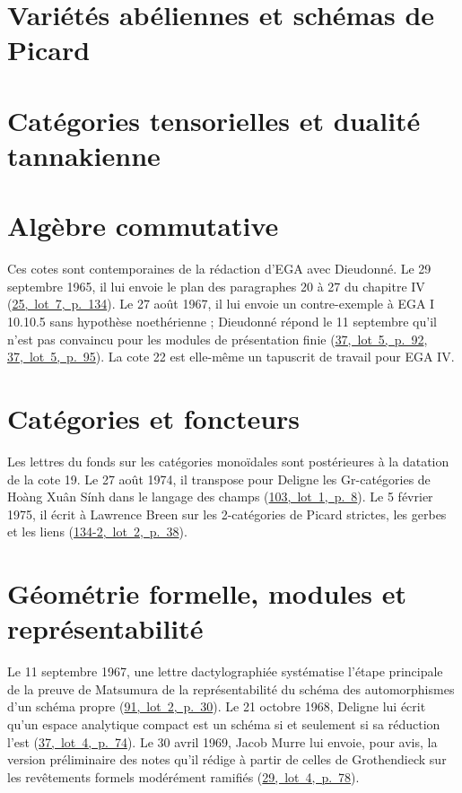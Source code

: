 \documentclass[11pt]{article}
\newcommand{\lot}[3]{\mbox{\href{https://grothendieck.commutator.io/\##1/#2/p#3}{#1, lot #2, p.~#3}}}
\newcommand{\lettres}[1]{{\small #1\par}\medskip}
\theoremstyle{plain}
\theoremstyle{definition}
\theoremstyle{plain}
\theoremstyle{definition}
\theoremstyle{remark}
\renewcommand{\_}{\bkunderscore\allowbreak}
\begin{document}
\part{Variétés abéliennes et schémas de Picard}







\part{Catégories tensorielles et dualité tannakienne}



\part{Algèbre commutative}
\lettres{Ces cotes sont contemporaines de la rédaction d'EGA avec Dieudonné. Le 29 septembre 1965, il lui envoie le plan des paragraphes 20 à 27 du chapitre IV (\lot{25}{7}{134}). Le 27 août 1967, il lui envoie un contre-exemple à EGA I 10.10.5 sans hypothèse noethérienne ; Dieudonné répond le 11 septembre qu'il n'est pas convaincu pour les modules de présentation finie (\lot{37}{5}{92}, \lot{37}{5}{95}). La cote 22 est elle-même un tapuscrit de travail pour EGA IV.}





\part{Catégories et foncteurs}
\lettres{Les lettres du fonds sur les catégories monoïdales sont postérieures à la datation de la cote 19. Le 27 août 1974, il transpose pour Deligne les Gr-catégories de Hoàng Xuân Sính dans le langage des champs (\lot{103}{1}{8}). Le 5 février 1975, il écrit à Lawrence Breen sur les 2-catégories de Picard strictes, les gerbes et les liens (\lot{134-2}{2}{38}).}





\part{Géométrie formelle, modules et représentabilité}
\lettres{Le 11 septembre 1967, une lettre dactylographiée systématise l'étape principale de la preuve de Matsumura de la représentabilité du schéma des automorphismes d'un schéma propre (\lot{91}{2}{30}). Le 21 octobre 1968, Deligne lui écrit qu'un espace analytique compact est un schéma si et seulement si sa réduction l'est (\lot{37}{4}{74}). Le 30 avril 1969, Jacob Murre lui envoie, pour avis, la version préliminaire des notes qu'il rédige à partir de celles de Grothendieck sur les revêtements formels modérément ramifiés (\lot{29}{4}{78}).}




\end{document}
